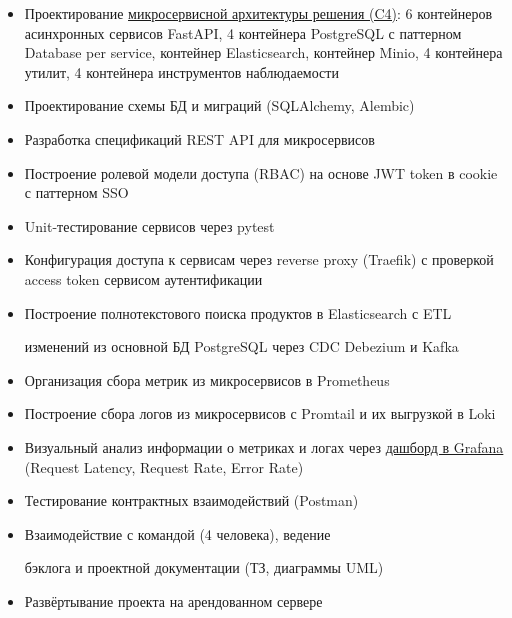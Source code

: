 \documentclass[14pt, a4paper, oneside]{extarticle}
\begin{document}
\begin{itemize}
	\vspace{-2\intextsep}
	\item Проектирование \href{https://github.com/Crazy5202/job_application_form/tree/main/portfolio/eComm_C4.pdf}{микросервисной архитектуры решения (C4)}: 6 контейнеров асинхронных сервисов FastAPI, 4 контейнера PostgreSQL с паттерном Database per service, контейнер Elasticsearch, контейнер Minio, 4 контейнера утилит, 4 контейнера инструментов наблюдаемости 
	\vspace{-0.8\intextsep}
	\item Проектирование схемы БД и миграций (SQLAlchemy, Alembic)
	\vspace{-0.8\intextsep}
	\item Разработка спецификаций REST API для микросервисов
	\vspace{-0.8\intextsep}
	\item Построение ролевой модели доступа (RBAC) на основе JWT token в cookie с паттерном SSO
	\vspace{-0.8\intextsep}
	\item Unit-тестирование сервисов через pytest
	\vspace{-0.8\intextsep}
	\item Конфигурация доступа к сервисам через reverse proxy (Traefik) с проверкой access token сервисом аутентификации
	\vspace{-0.8\intextsep}
	\item Построение полнотекстового поиска продуктов в Elasticsearch с ETL
	
	\vspace{-0.5\intextsep} 
	изменений из основной БД PostgreSQL через CDC Debezium и Kafka
	\vspace{-0.8\intextsep}
	\item Организация сбора метрик из микросервисов в Prometheus
	\vspace{-0.8\intextsep}
	\item Построение сбора логов из микросервисов с Promtail и их выгрузкой в Loki
	\vspace{-0.8\intextsep}
	\item Визуальный анализ информации о метриках и логах через \href{https://github.com/Crazy5202/job_application_form/tree/main/portfolio/eComm_Grafana.pdf}{дашборд в Grafana} (Request Latency, Request Rate, Error Rate)
	\vspace{-0.8\intextsep}
	\item Тестирование контрактных взаимодействий (Postman)
	\vspace{-0.8\intextsep}
    \item Взаимодействие с командой (4 человека), ведение 

    \vspace{-0.5\intextsep}
    бэклога и проектной документации (ТЗ, диаграммы UML)
    \vspace{-0.8\intextsep}
    \item Развёртывание проекта на арендованном сервере
\end{itemize}
\end{document}
